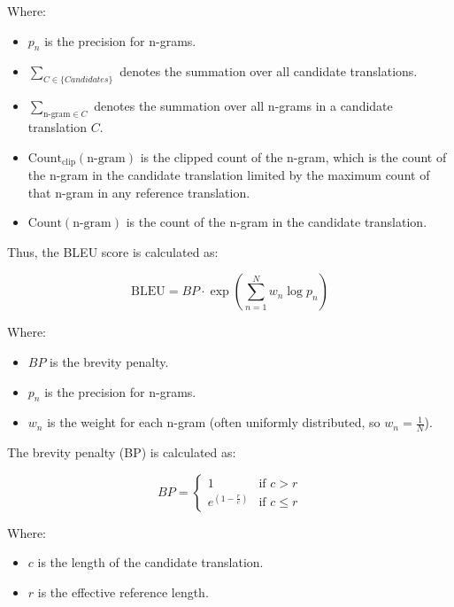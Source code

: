 \documentclass[a4paper]{article}
\begin{document}
Where:
\begin{itemize}
    \item \( p_n \) is the precision for n-grams.
    \item \( \sum_{C \in \{Candidates\}} \) denotes the summation over all candidate translations.
    \item \( \sum_{\text{n-gram} \in C} \) denotes the summation over all n-grams in a candidate translation \( C \).
    \item \( \text{Count}_{\text{clip}}(\text{n-gram}) \) is the clipped count of the n-gram, which is the count of the n-gram in the candidate translation limited by the maximum count of that n-gram in any reference translation.
    \item \( \text{Count}(\text{n-gram}) \) is the count of the n-gram in the candidate translation.
\end{itemize}

Thus, the BLEU score is calculated as:

\begin{equation}
    \text{BLEU} = BP \cdot \exp \left( \sum_{n=1}^{N} w_n \log p_n \right)
\end{equation}

Where:
\begin{itemize}
    \item \( BP \) is the brevity penalty.
    \item \( p_n \) is the precision for n-grams.
    \item \( w_n \) is the weight for each n-gram (often uniformly distributed, so \( w_n = \frac{1}{N} \)).
\end{itemize}

The brevity penalty (BP) is calculated as:

\begin{equation}
    BP = \begin{cases}
        1                     & \text{if } c > r    \\
        e^{(1 - \frac{r}{c})} & \text{if } c \leq r
    \end{cases}
\end{equation}

Where:
\begin{itemize}
    \item \( c \) is the length of the candidate translation.
    \item \( r \) is the effective reference length.
\end{itemize}
\end{document}
